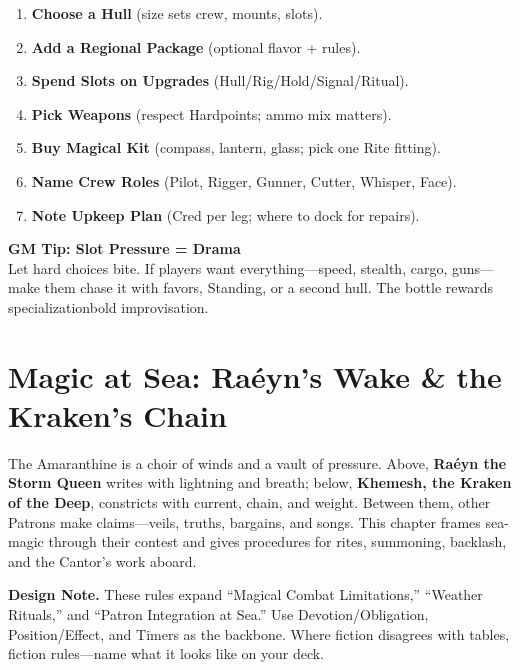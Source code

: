 \documentclass[11pt,oneside]{book}
\begin{document}
\begin{enumerate}[leftmargin=*,itemsep=2pt]
  \item \textbf{Choose a Hull} (size sets crew, mounts, slots).
  \item \textbf{Add a Regional Package} (optional flavor + rules).
  \item \textbf{Spend Slots on Upgrades} (Hull/Rig/Hold/Signal/Ritual).
  \item \textbf{Pick Weapons} (respect Hardpoints; ammo mix matters).
  \item \textbf{Buy Magical Kit} (compass, lantern, glass; pick one Rite fitting).
  \item \textbf{Name Crew Roles} (Pilot, Rigger, Gunner, Cutter, Whisper, Face).
  \item \textbf{Note Upkeep Plan} (Cred per leg; where to dock for repairs).
\end{enumerate}

\begin{tcolorbox}[breakable]
\textbf{GM Tip: Slot Pressure = Drama}\\
Let hard choices bite. If players want everything---speed, stealth, cargo, guns---make them chase it with favors, Standing, or a second hull. The bottle rewards specialization\dotsand bold improvisation.
\end{tcolorbox}

\chapter{Magic at Sea: Raéyn's Wake \& the Kraken's Chain}

\noindent The Amaranthine is a choir of winds and a vault of pressure. Above, \textbf{Raéyn the Storm Queen} writes with lightning and breath; below, \textbf{Khemesh, the Kraken of the Deep}, constricts with current, chain, and weight. Between them, other Patrons make claims---veils, truths, bargains, and songs. This chapter frames sea-magic through their contest and gives procedures for rites, summoning, backlash, and the Cantor's work aboard.

\begin{tcolorbox}[breakable]
\textbf{Design Note.} These rules expand ``Magical Combat Limitations,'' ``Weather Rituals,'' and ``Patron Integration at Sea.'' Use Devotion/Obligation, Position/Effect, and Timers as the backbone. Where fiction disagrees with tables, fiction rules---name what it looks like on your deck.
\end{tcolorbox}
\end{document}
